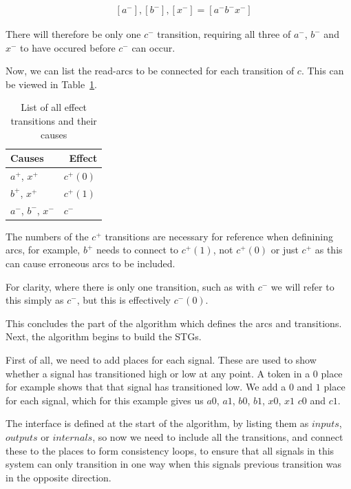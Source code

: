 \documentclass[british,conference,compsoc]{IEEEtran}
\begin{document}
\[
\begin{array}{lcl}
~&[a^{-}], [b^{-}], [x^{-}]  = [a^{-} b^{-} x^{-}]
\end{array}
\]

\noindent There will therefore be only one $c^{-}$ transition, requiring all three
of $a^{-}$, $b^{-}$ and $x^{-}$ to have occured before $c^{-}$
can occur. 

Now, we can list the read-arcs to be connected for each transition of $c$.
This can be viewed in Table~\ref{tab:list-by-transition}.

\begin{table}[h]
\caption{List of all effect transitions and their causes\label{tab:list-by-transition}}

  \centering
\begin{tabular}[htb]{| m{2.6cm} | m{2.0cm} |}
  \hline
Causes & \, Effect \\ \hline \hline
$a^{+}$, $x^{+}$ & $c^{+}(0)$ \\ \hline
$b^{+}$, $x^{+}$ & $c^{+}(1)$ \\ \hline
$a^{-}$, $b^{-}$, $x^{-}$ & $c^{-}$ \\ \hline
  \end{tabular}
\end{table}

The numbers of the $c^{+}$ transitions are necessary for reference
when definining arcs, for example, $b^{+}$ needs to connect to 
$c^{+}(1)$, not $c^{+}(0)$ or just $c^{+}$ as this can cause 
erroneous arcs to be included. 

For clarity, where there is only one transition, such as with $c^{-}$
we will refer to this simply as $c^{-}$, but this is effectively $c^{-}(0)$.

This concludes the part of the algorithm which defines the arcs
and transitions. Next, the algorithm begins to build the STGs. 

First of all, we need to add places for each signal. These are used to
show whether a signal has transitioned high or low at any point. 
A token in a $0$ place for example shows that that signal has 
transitioned low. We add a $0$ and $1$ place for each signal, 
which for this example gives us $a0$, $a1$, $b0$, $b1$, $x0$, $x1$
$c0$ and $c1$.

The interface is defined at the start of the algorithm, by listing them as $inputs$,
$outputs$ or $internals$, so now we need to include all the transitions, and
connect these to the places to form consistency loops, to ensure that all signals 
in this system can only transition in one way when this signals previous transition
was in the opposite direction. 
\end{document}
